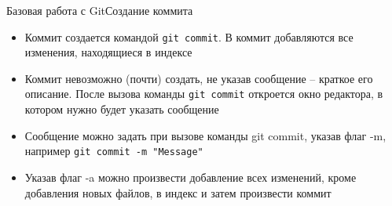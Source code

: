 \begin{frame}{Базовая работа с Git}{Создание коммита}
    \begin{itemize}
        \item
              Коммит создается командой \lstinline[style=BashInputStyle]{git commit}. В коммит добавляются все изменения, находящиеся в индексе
        \item
              Коммит невозможно (почти) создать, не указав сообщение -- краткое его описание. После вызова команды \lstinline[style=BashInputStyle]{git commit} откроется окно редактора, в котором нужно будет указать сообщение
        \item
              Сообщение можно задать при вызове команды git commit, указав флаг -m, например \lstinline[style=BashInputStyle]{git commit -m "Message"}
        \item
              Указав флаг -a можно произвести добавление всех изменений, кроме добавления новых файлов, в индекс и затем произвести коммит
    \end{itemize}
\end{frame}